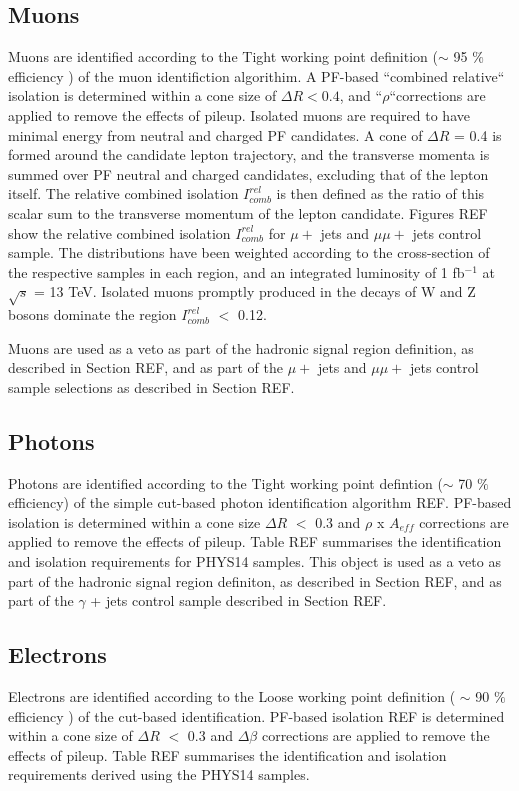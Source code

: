 \subsection{Muons}
Muons are identified according to the Tight working point definition ($\sim$ 95 $\%$ efficiency ) of the muon identifiction algorithim. A PF-based ``combined relative`` isolation is determined within a cone size of $\Delta R < 0.4 $, and ``$\rho$``corrections are applied to remove the effects of pileup. Isolated muons are required to have minimal energy from neutral and charged PF candidates. A cone of $\Delta R$ = 0.4 is formed around the candidate lepton trajectory, and the transverse momenta is summed over PF neutral and charged candidates, excluding that of the lepton itself. The relative combined isolation $I^{rel}_{comb}$ is then defined as the ratio of this scalar sum to the transverse momentum of the lepton candidate. 
Figures REF show the relative combined isolation $I^{rel}_{comb}$ for $\mu +$ jets and $\mu\mu +$ jets control sample. The distributions have been weighted according to the cross-section of the respective samples in each region, and an integrated luminosity of 1 fb$^{-1}$ at $\sqrt{s}$ = 13 TeV. Isolated muons promptly produced in the decays of W and Z bosons dominate the region $I^{rel}_{comb}$ $<$ 0.12.

Muons are used as a veto as part of the hadronic signal region definition, as described in Section REF, and as part of the $\mu +$ jets and $\mu\mu +$ jets control sample selections as described in Section REF.


\subsection{Photons}
Photons are identified according to the Tight working point defintion ($\sim$ 70 $\%$ efficiency) of the simple cut-based photon identification algorithm REF. PF-based isolation is determined within a cone size $\Delta R$ $<$ 0.3 and $\rho$ x $A_{eff}$ corrections are applied to remove the effects of pileup. Table REF summarises the identification and isolation requirements for PHYS14 samples. 
This object is used as a veto as part of the hadronic signal region definiton, as described in Section REF, and as part of the $\gamma$ + jets control sample described in Section REF.


\subsection{Electrons}
Electrons are identified according to the Loose working point definition ( $\sim$ 90 $\%$ efficiency ) of the cut-based identification. PF-based isolation REF is determined within a cone size of $\Delta R$ $<$ 0.3 and $\Delta \beta$ corrections are applied to remove the effects of pileup. Table REF summarises the identification and isolation requirements derived using the PHYS14 samples. 	



